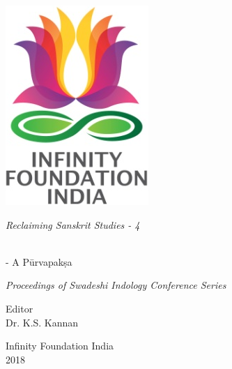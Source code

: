 \thispagestyle{empty}
\begin{center}
\includegraphics[scale=0.3]{figures/logo.png}
\bigskip

{\fontsize{10}{14}\selectfont\sl
Reclaiming Sanskrit Studies - 4}

\bigskip
\end{center}
\medskip

\begin{center}
{\fontsize{20}{24}\selectfont {\sl W\,E\,S\,T\,E\,R\,N\,\, I\,N\,D\,O\,L\,O\,G\,Y\,\\[8pt]
O\,N\,\, R\,A\,S\,A}}\\[10pt]
{\fontsize{20}{24}\selectfont - A Pūrvapakṣa}
\bigskip

{\sl\small Proceedings of Swadeshi Indology Conference Series}
\bigskip
\bigskip

{\fontsize{14}{18}\selectfont 
Editor\\
Dr. K.S. Kannan\par
}
\vfill

{\fontsize{12}{14}\selectfont
Infinity Foundation India\\[4pt]
2018}
\end{center}




